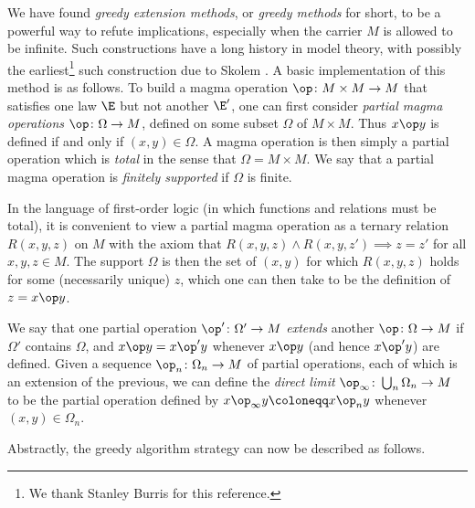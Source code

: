 We have found \emph{greedy extension methods}, or \emph{greedy methods} for short, to be a powerful way to refute implications, especially when the carrier $M$ is allowed to be infinite.  Such constructions have a long history in model theory, with possibly the earliest\footnote{We thank Stanley Burris for this reference.} such construction due to Skolem \cite{skolem}. A basic implementation of this method is as follows.  To build a magma operation $\op \colon M \times M \to M$ that satisfies one law $\E$ but not another ${\E'}$, one can first consider \emph{partial magma operations} $\op \colon \Omega \to M$, defined on some subset $\Omega$ of $M \times M$. Thus $x \op y$ is defined if and only if $(x,y) \in \Omega$. A magma operation is then simply a partial operation which is \emph{total} in the sense that $\Omega = M \times M$.  We say that a partial magma operation is \emph{finitely supported} if $\Omega$ is finite.

In the language of first-order logic (in which functions and relations must be total), it is convenient to view a partial magma operation as a ternary relation $R(x,y,z)$ on $M$ with the axiom that $R(x,y,z) \wedge R(x,y,z') \implies z=z'$ for all $x,y,z \in M$.  The support $\Omega$ is then the set of $(x,y)$ for which $R(x,y,z)$ holds for some (necessarily unique) $z$, which one can then take to be the definition of $z = x \op y$.

We say that one partial operation $\op' \colon \Omega' \to M$ \emph{extends} another $\op \colon \Omega \to M$ if $\Omega'$ contains $\Omega$, and $x \op y = x \op' y$ whenever $x \op y$ (and hence $x \op' y$) are defined. Given a sequence $\op_n \colon \Omega_n \to M$ of partial operations, each of which is an extension of the previous, we can define the \emph{direct limit} $\op_\infty \colon \bigcup_n \Omega_n \to M$ to be the partial operation defined by $x \op_\infty y \coloneqq x \op_n y$ whenever $(x,y) \in \Omega_n$.

Abstractly, the greedy algorithm strategy can now be described as follows.

